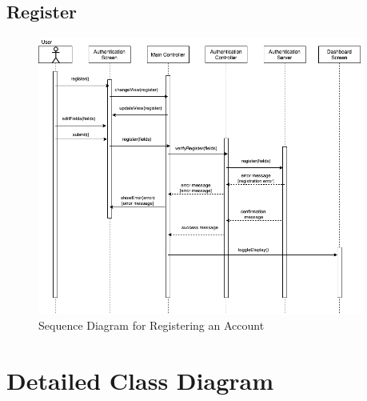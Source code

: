 \documentclass[]{article}
\begin{document}
\subsection{Register}
\label{sub:register_seq}
\begin{figure}[H]
\begin{center}
\includegraphics[width=0.95\textwidth]{D3/images/RegisterAccount.png}
\end{center}
\caption{Sequence Diagram for Registering an Account}
\label{fig:Register}
\end{figure}

\section{Detailed Class Diagram}
\label{sec:detailed_class_diagram}

\label{sub:detailed class diagram}
\end{document}
